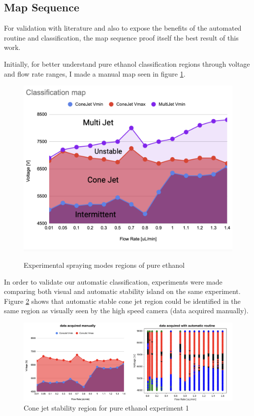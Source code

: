 \subsection{Map Sequence}
\label{subsec:map_results}

For validation with literature and also to expose the benefits of the automated routine and classification, the map sequence proof itself the best result of this work.

    Initially, for better understand pure ethanol classification regions through voltage and flow rate ranges, I made a manual map seen in figure \ref{fig:stability_1}.

    \begin{figure}[H]
        \center
        \includegraphics[width=12cm]{Figuras/regions.png}
        \label{fig:stability_1}
        \caption{Experimental spraying modes regions of pure ethanol}
    \end{figure}


    In order to validate our automatic classification, experiments were made comparing both visual and automatic stability island on the same experiment.
    Figure \ref{fig:stability_2} shows that automatic stable cone jet region could be identified in the same region as visually seen by the high speed camera (data acquired manually).

        \begin{figure}[H]
            \center
            \includegraphics[width=16cm]{Figuras/april/manual_stability_island.png}
            \caption{Cone jet stability region for pure ethanol experiment 1}
            \label{fig:stability_2}
        \end{figure}


